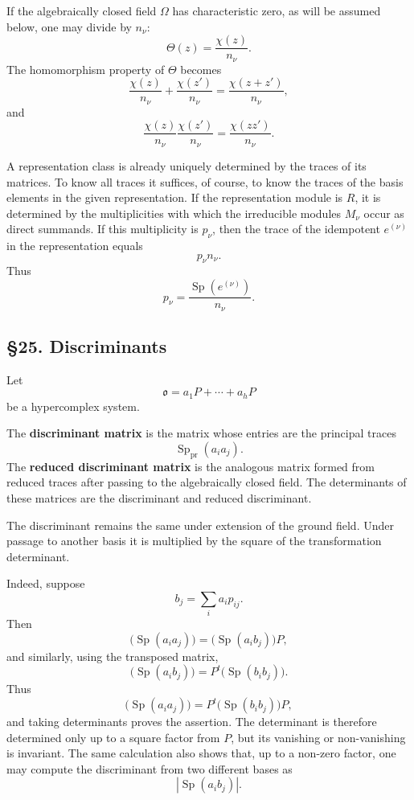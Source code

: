 \documentclass[11pt]{article}
\begin{document}
If the algebraically closed field \(\Omega\) has characteristic zero, as
will be assumed below, one may divide by \(n_\nu\): \[
  \Theta(z)=\frac{\chi(z)}{n_\nu}.
\] The homomorphism property of \(\Theta\) becomes \[
  \frac{\chi(z)}{n_\nu}+\frac{\chi(z')}{n_\nu}
    =\frac{\chi(z+z')}{n_\nu},
\] and \[
  \frac{\chi(z)}{n_\nu}\frac{\chi(z')}{n_\nu}
    =\frac{\chi(zz')}{n_\nu}.
\]

A representation class is already uniquely determined by the traces of
its matrices. To know all traces it suffices, of course, to know the
traces of the basis elements in the given representation. If the
representation module is \(R\), it is determined by the multiplicities
with which the irreducible modules \(M_\nu\) occur as direct summands.
If this multiplicity is \(p_\nu\), then the trace of the idempotent
\(e^{(\nu)}\) in the representation equals \[
  p_\nu n_\nu.
\] Thus \[
  p_\nu=\frac{\operatorname{Sp}(e^{(\nu)})}{n_\nu}.
\]

\subsection{§25. Discriminants}\label{discriminants}

Let \[
  \mathfrak{o}=a_1P+
\cdots+a_hP
\] be a hypercomplex system.

The \textbf{discriminant matrix} is the matrix whose entries are the
principal traces \[
  \operatorname{Sp}_{\mathrm{pr}}(a_i a_j).
\] The \textbf{reduced discriminant matrix} is the analogous matrix
formed from reduced traces after passing to the algebraically closed
field. The determinants of these matrices are the discriminant and
reduced discriminant.

The discriminant remains the same under extension of the ground field.
Under passage to another basis it is multiplied by the square of the
transformation determinant.

Indeed, suppose \[
  b_j=\sum_i a_i p_{ij}.
\] Then \[
  \bigl(\operatorname{Sp}(a_i a_j)\bigr)
    =\bigl(\operatorname{Sp}(a_i b_j)\bigr)P,
\] and similarly, using the transposed matrix, \[
  \bigl(\operatorname{Sp}(a_i b_j)\bigr)
    =P^t\bigl(\operatorname{Sp}(b_i b_j)\bigr).
\] Thus \[
  \bigl(\operatorname{Sp}(a_i a_j)\bigr)
    =P^t\bigl(\operatorname{Sp}(b_i b_j)\bigr)P,
\] and taking determinants proves the assertion. The determinant is
therefore determined only up to a square factor from \(P\), but its
vanishing or non-vanishing is invariant. The same calculation also shows
that, up to a non-zero factor, one may compute the discriminant from two
different bases as \[
  \left|\operatorname{Sp}(a_i b_j)\right|.
\]
\end{document}

